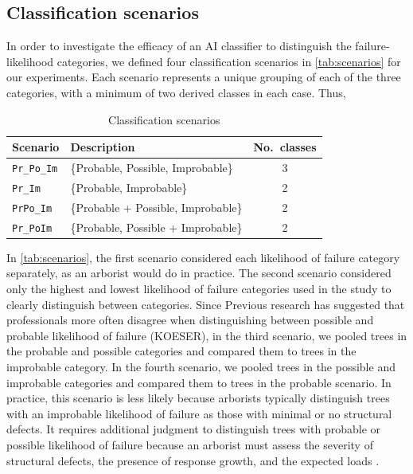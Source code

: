 \documentclass[Journal,letterpaper, SingleSpace, InsideFigs]{ascelike-new}
\begin{document}
\subsection{Classification scenarios}
In order to investigate the efficacy of an AI classifier to distinguish the failure-likelihood categories, 
we defined four classification scenarios in \autoref{tab:scenarios} for our experiments. 
Each scenario represents a unique grouping of each of the three categories, with a minimum of two derived classes in each case.
Thus, 
\begin{table}[h!]
    \centering
    \begin{tabular}{l l c}\toprule
    \bf Scenario            & \bf Description  & \bf No.\ classes\\\midrule
    \texttt{Pr\_Po\_Im}     &  \{Probable, Possible, Improbable\} & 3 \\
    \texttt{Pr\_Im}          & \{Probable, Improbable\}           & 2 \\
    \texttt{PrPo\_Im}        & \{Probable + Possible, Improbable\}  & 2 \\
    \texttt{Pr\_PoIm}        & \{Probable, Possible + Improbable\}  & 2 \\\bottomrule
    \end{tabular}
    \caption{Classification scenarios}
    \label{tab:scenarios}
\end{table}


In \autoref{tab:scenarios}, the first scenario considered each likelihood of failure category separately, as an arborist would do in practice. The second scenario considered only the highest and lowest likelihood of failure categories used in the study to clearly distinguish between categories. Since Previous research has suggested that professionals more often disagree when distinguishing between possible and probable likelihood of failure (KOESER), in the third scenario, we pooled trees in the probable and possible categories and compared them to trees in the improbable category. In the fourth scenario, we pooled trees in the possible and improbable categories and compared them to trees in the probable scenario. In practice, this scenario is less likely because arborists typically distinguish trees with an improbable likelihood of failure as those with minimal or no structural defects. It requires additional judgment to distinguish trees with probable or possible likelihood of failure because an arborist must assess the severity of structural defects, the presence of response growth, and the expected loads \cite{smiley2017best}.
\end{document}
